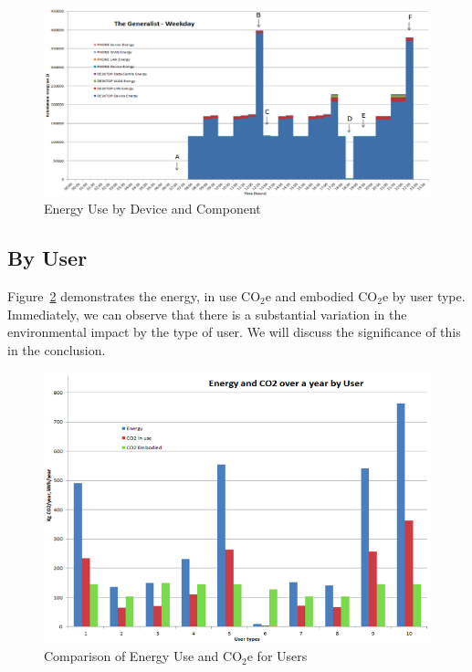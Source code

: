 \documentclass[conference]{IEEEtran}
\begin{document}
\begin{figure}[!htp]
\centering
\includegraphics[width=\columnwidth]{images/generalist_weekday.png}
\caption{Energy Use by Device and Component}
\label{fig:generalist_weekday} 
\end{figure}

\subsection{By User}

Figure~\ref{fig:energyuse_co2e_overyearbyuser} demonstrates the
energy, in use CO$_2$e and embodied CO$_2$e by user type.  Immediately, we
can observe that there is a substantial variation in the environmental
impact by the type of user. We will discuss the significance of this
in the conclusion.

\begin{figure}[!htp]
\centering
\includegraphics[width=\columnwidth]{images/energyuse_co2e_overyearbyuser.png}
\caption{Comparison of Energy Use and CO$_2$e for Users}
\label{fig:energyuse_co2e_overyearbyuser} 
\end{figure}
\end{document}
